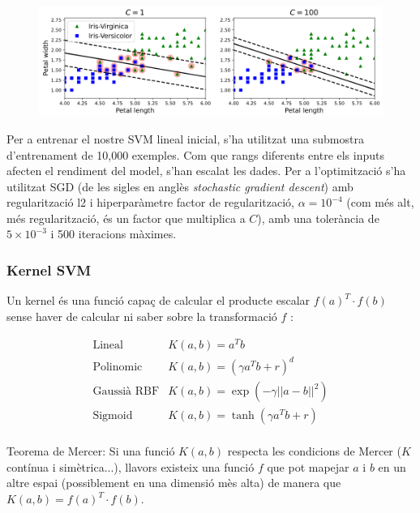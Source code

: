 \documentclass[12pt, spanish]{article}
\begin{document}
\begin{figure}[hbt!]
\centering
\includegraphics[width = 1\linewidth]{images/svc_exp.png}
\label{fig:svc_exp}
\end{figure}



Per a entrenar el nostre SVM lineal inicial, s'ha utilitzat una submostra d'entrenament de 10,000 exemples. Com que rangs diferents entre els inputs afecten el rendiment del model, s'han escalat les dades. Per a l'optimització s'ha utilitzat SGD (de les sigles en anglès \textit{stochastic gradient descent}) amb regularització l2 i hiperparàmetre factor de regularització, $\alpha = 10^{-4}$ (com més alt, més regularització, és un factor que multiplica a $C$), amb una tolerància de $5 \times 10^{-3}$ i 500 iteracions màximes.


\subsubsection{Kernel SVM}

Un kernel és una funció capaç de calcular el producte escalar $f(a)^T \cdot f(b)$ sense haver de calcular ni saber sobre la transformació $f$ \cite[Cap. 5]{geron2019hands}:

\begin{equation} 
\begin{split}
\text{Lineal}          & K(a,b) = a^Tb \\
\text{Polinomic }    & K(a,b) = (\gamma a^T b + r)^d \\
\text{Gaussià RBF}& K(a,b) = \exp(-\gamma ||a - b||^2) \\
\text{Sigmoid}       & K(a,b) =  \tanh(\gamma a^Tb + r)\\
\end{split}
\end{equation}

Teorema de Mercer: Si una funció $K(a,b)$ respecta les condicions de Mercer ($K$ contínua i simètrica...), llavors existeix una funció $f$ que pot mapejar $a$ i $b$ en un altre espai (possiblement en una dimensió mès alta) de manera que $K(a,b) = f(a)^T \cdot f(b)$. 
\end{document}
